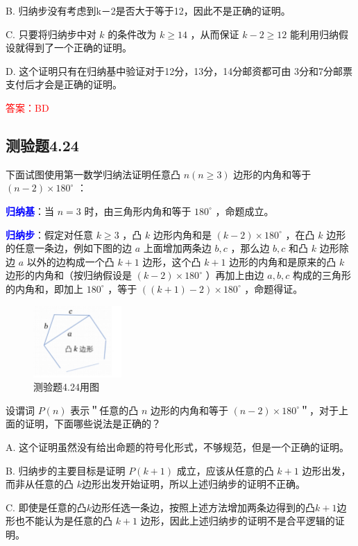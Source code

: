 \documentclass[UTF8, heading=true]{ctexart}
\begin{document}
B. 
归纳步没有考虑到k－2是否大于等于12，因此不是正确的证明。

C. 
只要将归纳步中对 $k$ 的条件改为 $k \geq 14$ ，从而保证 $k-2 \geq 12$ 能利用归纳假设就得到了一个正确的证明。

D. 
这个证明只有在归纳基中验证对于12分，13分，14分邮资都可由 3分和7分邮票支付后才会是正确的证明。


\textcolor{red}{答案：BD}

\subsection{测验题4.24}

下面试图使用第一数学归纳法证明任意凸 $n(n \geq 3)$ 边形的内角和等于 $(n-2) \times 180^{\circ}$ ：

\textcolor{blue}{\textbf{归纳基}}：当 $n=3$ 时，由三角形内角和等于 $180^{\circ}$ ，命题成立。

\textcolor{blue}{\textbf{归纳步}}：假定对任意 $k \geq 3$ ，凸 $k$ 边形内角和是 $(k-2) \times 180^{\circ}$ ，在凸 $k$ 边形的任意一条边，例如下图的边 $a$ 上面增加两条边 $b, c$ ，那么边 $b, c$ 和凸 $k$ 边形除边 $a$ 以外的边构成一个凸 $k+1$ 边形，这个凸 $k+1$ 边形的内角和是原来的凸 $k$ 边形的内角和（按归纳假设是 $(k-2) \times 180^{\circ}$ ）再加上由边 $a, b, c$ 构成的三角形的内角和，即加上 $180^{\circ}$ ，等于 $((k+1)-2) \times 180^{\circ}$ ，命题得证。

\begin{figure}[H]
    \centering
    \includegraphics[width=0.3\textwidth]{4.24.jpg} %
    \caption{测验题4.24用图}
\end{figure}

设谓词 $P(n)$ 表示＂任意的凸 $n$ 边形的内角和等于 $(n-2) \times 180^{\circ}$＂，对于上面的证明，下面哪些说法是正确的？


A. 
这个证明虽然没有给出命题的符号化形式，不够规范，但是一个正确的证明。

B. 归纳步的主要目标是证明 $P(k+1)$ 成立，应该从任意的凸 $k+1$ 边形出发，而非从任意的凸 $k$边形出发开始证明，所以上述归纳步的证明不正确。

C. 
即使是任意的凸$k$边形任选一条边，按照上述方法增加两条边得到的凸$k+1$边形也不能认为是任意的凸 $k+1$ 边形，因此上述归纳步的证明不是合平逻辑的证明。
\end{document}
